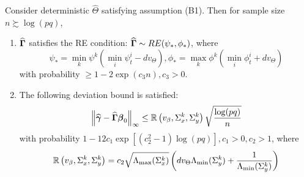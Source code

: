 \documentclass[12pt, letterpaper]{article}
\numberwithin{equation}{section}
\begin{document}
\begin{Proposition}\label{prop:ThmBetaRE}
Consider deterministic $\widehat \Theta$ satisfying assumption (B1). Then for sample size $n \succsim \log (pq)$,

\begin{enumerate}
%
\item %
$\widehat {{\boldsymbol{\Gamma}}}$ satisfies the RE condition: $ \widehat {{\boldsymbol{\Gamma}}} \sim RE (\psi_*, \phi_*)$, where 
%
$$
\psi_* = \min_k \psi^k \left( \min_i \psi_t^i - d v_\Theta \right), 
\phi_* = \max_k \phi^k \left( \min_i \phi_t^i + d v_\Theta \right)
$$
%
with probability $\geq 1 - 2 \exp(c_3 n), c_3>0$.
%
\item The following deviation bound is satisfied:
%
%
$$
\left\| \widehat {{\boldsymbol{\gamma}}} - \widehat {{\boldsymbol{\Gamma}}} {\boldsymbol{\beta}}_0 \right\|_\infty \leq {\mathbb{R}} \left(v_\beta, \Sigma_x^k, \Sigma_y^k \right) \sqrt{ \frac{ \log(pq)}{n}}
$$
%
with probability $1 - 12 c_1 \exp[ (c_2^2-1) \log (pq)], c_1>0, c_2>1$, where
$$
{\mathbb{R}} \left(v_\beta, \Sigma_x^k, \Sigma_y^k \right) = c_2 \sqrt{\Lambda_{\max} (\Sigma_x^k)} \left( d v_\Theta \Lambda_{\min} (\Sigma_y^k) +
\frac{1}{\Lambda_{\min} (\Sigma_y^k) } \right)
$$
\end{enumerate} 
\end{Proposition}
\end{document}
